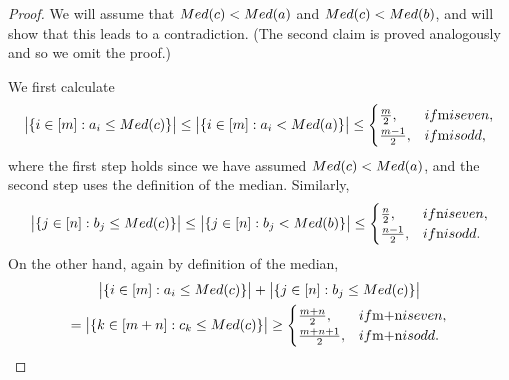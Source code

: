 \documentclass[12pt]{article}
\begin{document}
\begin{proof}
    We will assume that $\textnormal{Med}(c)< \textnormal{Med}(a)$ and $\textnormal{Med}(c) < \textnormal{Med}(b)$, and will show that this leads to a contradiction. (The second claim is proved analogously and so we omit the proof.) 

We first calculate
    \[\bigl|\{i \in [m]:a_i\leq  \textnormal{Med}(c)\}\bigr|\leq\bigl|\{i \in [m]:a_i < \textnormal{Med}(a)\}\bigr|\leq \begin{cases} \frac{m}{2}, &\textnormal{ if $m$ is even,}\\
    \frac{m-1}{2}, & \textnormal{ if $m$ is odd},\end{cases}\]
    where the first step holds since we have assumed $\textnormal{Med}(c)< \textnormal{Med}(a)$, and the second step uses the definition of the median. Similarly,
    \[\bigl|\{j \in [n]:b_j \leq  \textnormal{Med}(c)\}\bigr|\leq \bigl|\{j \in [n]:b_j < \textnormal{Med}(b)\}\bigr|\leq \begin{cases} \frac{n}{2}, &\textnormal{ if $n$ is even,}\\
    \frac{n-1}{2}, & \textnormal{ if $n$ is odd}.\end{cases}\]
    On the other hand, again by definition of the median,
    \begin{multline*}\bigl|\{i \in [m]:a_i\leq  \textnormal{Med}(c)\}\bigr| + \bigl|\{j \in [n]:b_j \leq  \textnormal{Med}(c)\}\bigr| \\= \bigl|\{k \in [m+n]:c_k \leq \textnormal{Med}(c)\}\bigr| \geq \begin{cases}\frac{m+n}{2}, & \textnormal{ if $m+n$ is even}, \\ \frac{m+n+1}{2}, & \textnormal{ if $m+n$ is odd}.\end{cases}\end{multline*}


\end{proof}
\end{document}
